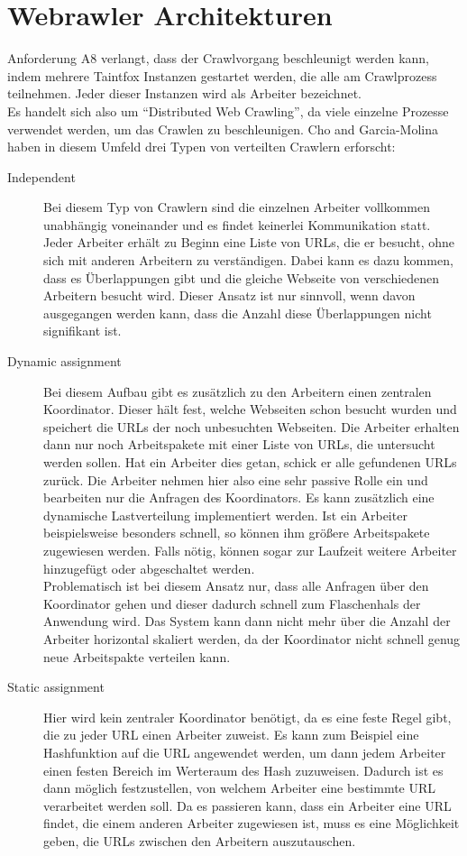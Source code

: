 \section{Webrawler Architekturen}
\label{sec:WebcrawlerArchitekturen}
Anforderung A8 verlangt, dass der Crawlvorgang beschleunigt werden kann, indem mehrere Taintfox Instanzen gestartet werden, die alle am Crawlprozess teilnehmen. Jeder dieser Instanzen wird als Arbeiter bezeichnet. \\ 
Es handelt sich also um \enquote{Distributed Web Crawling}, da viele einzelne Prozesse verwendet werden, um das Crawlen zu beschleunigen. 
Cho and Garcia-Molina haben in diesem Umfeld drei Typen von verteilten Crawlern erforscht\cite{ParallelCrawlers}: 
\begin{description}
	\item[Independent] 
	Bei diesem Typ von Crawlern sind die einzelnen Arbeiter vollkommen unabhängig voneinander und es findet keinerlei Kommunikation statt. Jeder Arbeiter erhält zu Beginn eine Liste von URLs, die er besucht, ohne sich mit anderen Arbeitern zu verständigen. Dabei kann es dazu kommen, dass es Überlappungen gibt und die gleiche Webseite von verschiedenen Arbeitern besucht wird. Dieser Ansatz ist nur sinnvoll, wenn davon ausgegangen werden kann, dass die Anzahl diese Überlappungen nicht signifikant ist.
	\item[Dynamic assignment]
	Bei diesem Aufbau gibt es zusätzlich zu den Arbeitern einen zentralen Koordinator. Dieser hält fest, welche Webseiten schon besucht wurden und speichert die URLs der noch unbesuchten Webseiten. Die Arbeiter erhalten dann nur noch Arbeitspakete mit einer Liste von URLs, die untersucht werden sollen. Hat ein Arbeiter dies getan, schick er alle gefundenen URLs zurück. Die Arbeiter nehmen hier also eine sehr passive Rolle ein und bearbeiten nur die Anfragen des Koordinators. Es kann zusätzlich eine dynamische Lastverteilung implementiert werden. Ist ein Arbeiter beispielsweise besonders schnell, so können ihm größere Arbeitspakete zugewiesen werden. Falls nötig, können sogar zur Laufzeit weitere Arbeiter hinzugefügt oder abgeschaltet werden.\\
	Problematisch ist bei diesem Ansatz nur, dass alle Anfragen über den Koordinator gehen und dieser dadurch schnell zum Flaschenhals der Anwendung wird. Das System kann dann nicht mehr über die Anzahl der Arbeiter horizontal skaliert werden, da der Koordinator nicht schnell genug neue Arbeitspakte verteilen kann.
	\item[Static assignment] 
	Hier wird kein zentraler Koordinator benötigt, da es eine feste Regel gibt, die zu jeder URL einen Arbeiter zuweist. Es kann zum Beispiel eine Hashfunktion auf die URL angewendet werden, um dann jedem Arbeiter einen festen Bereich im Werteraum des Hash zuzuweisen. Dadurch ist es dann möglich festzustellen, von welchem Arbeiter eine bestimmte URL verarbeitet werden soll. Da es passieren kann, dass ein Arbeiter eine URL findet, die einem anderen Arbeiter zugewiesen ist, muss es eine Möglichkeit geben, die URLs zwischen den Arbeitern auszutauschen.
\end{description}

